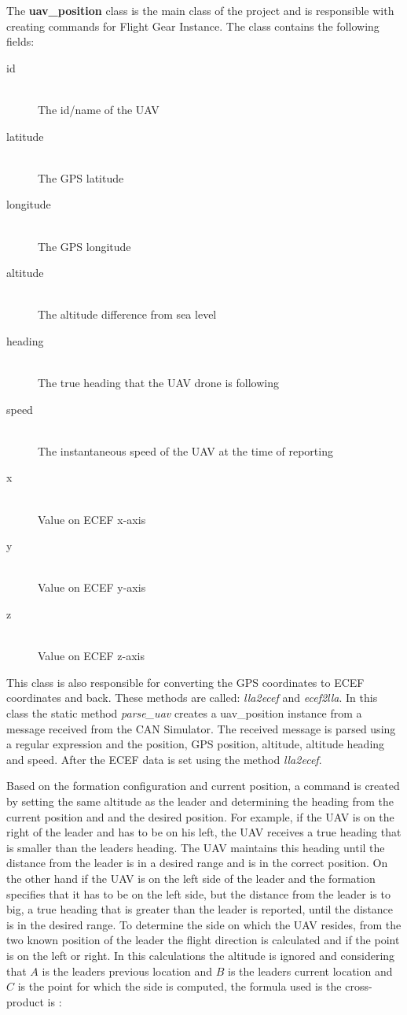 The \textbf{uav_position} class is the main class of the project and is
responsible with creating commands for Flight Gear Instance. The class
contains the following fields:

\begin{description}
\item [id] \hfill \\ The id/name of the UAV
\item [latitude] \hfill \\ The GPS latitude
\item [longitude] \hfill \\ The GPS longitude
\item [altitude] \hfill \\ The altitude difference from sea level
\item [heading] \hfill \\ The true heading that the UAV drone is following
\item [speed] \hfill \\ The instantaneous speed of the UAV at the time of reporting
\item [x] \hfill \\ Value on ECEF x-axis
\item [y] \hfill \\ Value on ECEF y-axis
\item [z] \hfill \\ Value on ECEF z-axis
\end{description}
% 
This class is also responsible for converting the GPS coordinates to ECEF coordinates
and back. These methods are called: \textit{lla2ecef} and \textit{ecef2lla}. In 
this class the static method \textit{parse_uav} creates a uav_position instance
from a message received from the CAN Simulator. The received message
is parsed using a regular expression and the position, GPS position,  altitude, 
altitude heading and speed. After the ECEF data is set using the method 
\textit{lla2ecef}.
 
Based on the formation configuration and current position, a command is created 
by setting the same altitude as the leader and determining the heading 
from the current position and and the desired position. For example, if the UAV
is on the right of the leader and has to be on his left, the UAV receives a
true heading that is smaller than the leaders heading. The UAV maintains this heading
until the distance from the leader is in a desired range and is in the correct
position. On the other hand if the UAV is on the left side of the leader and
the formation specifies that it has to be on the left side, but the distance
from the leader is to big, a true heading that is greater than the leader is 
reported, until the distance is in the desired range. To determine the side on
which the UAV resides,  from the two known position of the leader 
the flight direction is calculated and if the point is on the left or right.
In this calculations the altitude is ignored and considering that $A$ is the 
leaders previous location and $B$ is the leaders current location and $C$
is the point for which the side is computed, the formula used is the 
cross-product is :

